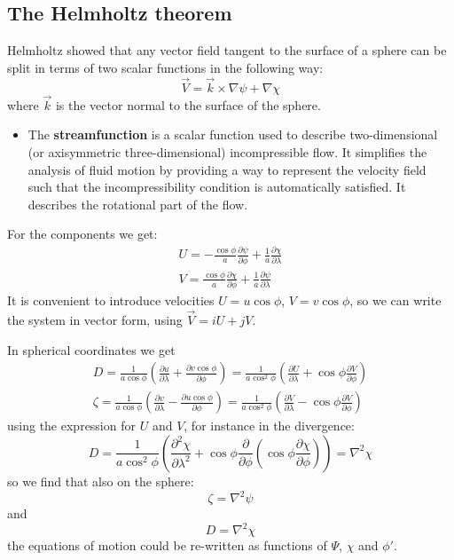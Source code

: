 \subsection{The Helmholtz theorem}
Helmholtz showed that any vector field tangent to the surface of a sphere can be
split in terms of two scalar functions in the following way:
\begin{equation}\label{eq.helmholtz}
    \vec{V}=\vec{k}\times\nabla\psi+\nabla\chi
\end{equation}
where $\vec{k}$ is the vector normal to the surface of the sphere. 
\begin{itemize}
    \item The \textbf{streamfunction} is a scalar function used to describe two-dimensional (or axisymmetric three-dimensional) incompressible flow. It simplifies the analysis of fluid motion by providing a way to represent the velocity field such that the incompressibility condition is automatically satisfied. It describes the rotational part of the flow.
\end{itemize}

For the components we get:
\begin{align}\label{eq.components helmholtz}
    U=-\frac{\cos\phi}{a}\frac{\partial\psi}{\partial\phi}+\frac{1}{a}\frac{\partial\chi}{\partial\lambda}\\
    V=\frac{\cos\phi}{a}\frac{\partial\chi}{\partial\phi}+\frac{1}{a}\frac{\partial\psi}{\partial\lambda}
\end{align}
It is convenient to introduce velocities $U=u\cos\phi$, $V=v\cos\phi$, so we can write the system in vector form, using $\vec{V}=iU+jV$. 

In spherical coordinates we get 
\begin{align*}
    D=\frac{1}{a\cos\phi}\left(\frac{\partial u}{\partial\lambda}+\frac{\partial v\cos\phi}{\partial\phi}\right)=\frac{1}{a\cos^2\phi}\left(\frac{\partial U}{\partial\lambda}+\cos\phi\frac{\partial V}{\partial\phi}\right)\\
    \zeta= \frac{1}{a\cos\phi}\left(\frac{\partial v}{\partial\lambda}-\frac{\partial u\cos\phi}{\partial\phi}\right)=\frac{1}{a\cos^2\phi}\left(\frac{\partial V}{\partial\lambda}-\cos\phi\frac{\partial V}{\partial\phi}\right)
\end{align*}
using the expression for $U$ and $V$, for instance in the divergence:
\begin{equation}\label{eq.finitedivergence}
    D=\frac{1}{a\cos^2\phi}\left(\frac{\partial^2\chi}{\partial\lambda^2}+\cos\phi\frac{\partial}{\partial\phi}\left(\cos\phi\frac{\partial\chi}{\partial\phi}\right)\right)=\nabla^2\chi
\end{equation}
so we find that also on the sphere:
\begin{equation}\label{eq. vorticity}
    \zeta=\nabla^2\psi
\end{equation}
and 
\begin{equation}\label{eq.divergence}
    D=\nabla^2\chi
\end{equation}
the equations of motion could be re-written as functions of $\Psi$, $\chi$ and $\phi'$.

